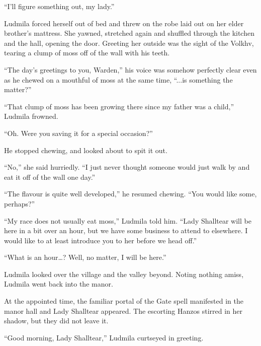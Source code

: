  

“I’ll figure something out, my lady.”

 

Ludmila forced herself out of bed and threw on the robe laid out on her elder brother’s mattress. She yawned, stretched again and shuffled through the kitchen and the hall, opening the door. Greeting her outside was the sight of the Volkhv, tearing a clump of moss off of the wall with his teeth.

 

“The day’s greetings to you, Warden,” his voice was somehow perfectly clear even as he chewed on a mouthful of moss at the same time, “...is something the matter?”

 

“That clump of moss has been growing there since my father was a child,” Ludmila frowned.

 

“Oh. Were you saving it for a special occasion?”

 

He stopped chewing, and looked about to spit it out.

 

“No,” she said hurriedly. “I just never thought someone would just walk by and eat it off of the wall one day.”

 

“The flavour is quite well developed,” he resumed chewing. “You would like some, perhaps?”

 

“My race does not usually eat moss,” Ludmila told him. “Lady Shalltear will be here in a bit over an hour, but we have some business to attend to elsewhere. I would like to at least introduce you to her before we head off.”

 

“What is an hour…? Well, no matter, I will be here.”

 

Ludmila looked over the village and the valley beyond. Noting nothing amiss, Ludmila went back into the manor.

 

At the appointed time, the familiar portal of the Gate spell manifested in the manor hall and Lady Shalltear appeared. The escorting Hanzos stirred in her shadow, but they did not leave it.

 

“Good morning, Lady Shalltear,” Ludmila curtseyed in greeting.

